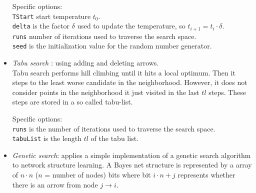 \begin{itemize}
Specific options:\\
{\tt TStart} start temperature $t_0$.\\
{\tt delta} is the factor $\delta$ used to update the temperature, so $t_{i+1}=t_i \cdot \delta$.\\
{\tt runs} number of iterations used to traverse the search space.\\
{\tt seed} is the initialization value for the random number generator.\\

\item \textit{Tabu search} \cite{bouck1995}:
using adding and deleting arrows.\\
Tabu search performs hill climbing until it hits a local optimum.
Then it steps to the least worse candidate in the neighborhood. However,
it does not consider points in the neighborhood it just visited in the
last $tl$ steps. These steps are stored in a so called tabu-list.

\begin{center}
\end{center}

Specific options: \\
{\tt runs} is the number of iterations used to traverse the search space.\\
{\tt tabuList} is the length $tl$ of the tabu list.

\item \textit{Genetic search}: applies a simple implementation of a genetic search algorithm
to network structure learning. A Bayes net structure is represented by a array
of $n\cdot n$ ($n$ = number of nodes) bits where bit $i\cdot n + j$ represents whether
there is an arrow from node $j\to i$.\\

\begin{center}
\end{center}


\end{itemize}
